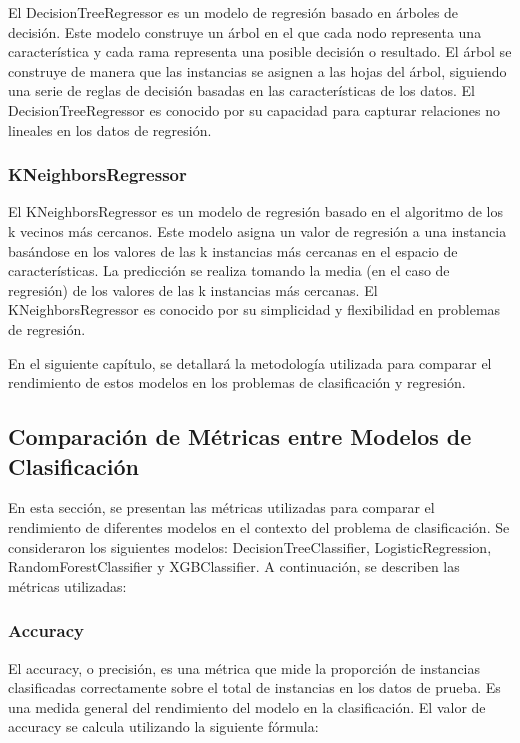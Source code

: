 El DecisionTreeRegressor es un modelo de regresión basado en árboles de decisión. Este modelo construye un árbol en el que cada nodo representa una característica y cada rama representa una posible decisión o resultado. El árbol se construye de manera que las instancias se asignen a las hojas del árbol, siguiendo una serie de reglas de decisión basadas en las características de los datos. El DecisionTreeRegressor es conocido por su capacidad para capturar relaciones no lineales en los datos de regresión.

\subsubsection{KNeighborsRegressor}

El KNeighborsRegressor es un modelo de regresión basado en el algoritmo de los k vecinos más cercanos. Este modelo asigna un valor de regresión a una instancia basándose en los valores de las k instancias más cercanas en el espacio de características. La predicción se realiza tomando la media (en el caso de regresión) de los valores de las k instancias más cercanas. El KNeighborsRegressor es conocido por su simplicidad y flexibilidad en problemas de regresión.

En el siguiente capítulo, se detallará la metodología utilizada para comparar el rendimiento de estos modelos en los problemas de clasificación y regresión.



\subsection{Comparación de Métricas entre Modelos de Clasificación}

En esta sección, se presentan las métricas utilizadas para comparar el rendimiento de diferentes modelos en el contexto del problema de clasificación. Se consideraron los siguientes modelos: DecisionTreeClassifier, LogisticRegression, RandomForestClassifier y XGBClassifier. A continuación, se describen las métricas utilizadas:

\subsubsection{Accuracy}
El accuracy, o precisión, es una métrica que mide la proporción de instancias clasificadas correctamente sobre el total de instancias en los datos de prueba. Es una medida general del rendimiento del modelo en la clasificación. El valor de accuracy se calcula utilizando la siguiente fórmula:


